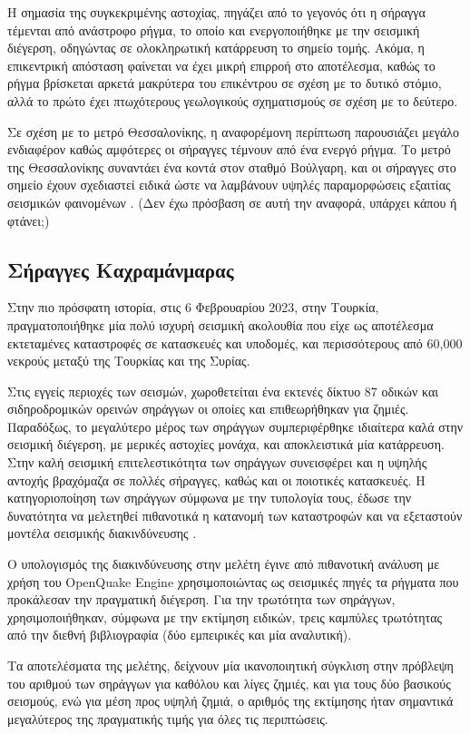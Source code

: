 Η σημασία της συγκεκριμένης αστοχίας, πηγάζει από το γεγονός ότι η σήραγγα τέμενται από ανάστροφο ρήγμα, το οποίο και ενεργοποιήθηκε με την σεισμική διέγερση, οδηγώντας σε ολοκληρωτική κατάρρευση το σημείο τομής. Ακόμα, η επικεντρική απόσταση φαίνεται να έχει μικρή επιρροή στο αποτέλεσμα, καθώς το ρήγμα βρίσκεται αρκετά μακρύτερα του επικέντρου σε σχέση με το δυτικό στόμιο, αλλά το πρώτο έχει πτωχότερους γεωλογικούς σχηματισμούς σε σχέση με το δεύτερο.

Σε σχέση με το μετρό Θεσσαλονίκης, η αναφορέμονη περίπτωση παρουσιάζει μεγάλο ενδιαφέρον καθώς αμφότερες οι σήραγγες τέμνουν από ένα ενεργό ρήγμα. Το μετρό της Θεσσαλονίκης συναντάει ένα κοντά στον σταθμό Βούλγαρη, και οι σήραγγες στο σημείο έχουν σχεδιαστεί ειδικά ώστε να λαμβάνουν υψηλές παραμορφώσεις εξαιτίας σεισμικών φαινομένων \parencite{Gavrielatou}. (Δεν έχω πρόσβαση σε αυτή την αναφορά, υπάρχει κάπου ή φτάνει;)

\subsection{Σήραγγες Καχραμάνμαρας}
Στην πιο πρόσφατη ιστορία, στις 6 Φεβρουαρίου 2023, στην Τουρκία, πραγματοποιήθηκε μία πολύ ισχυρή σεισμική ακολουθία που είχε ως αποτέλεσμα εκτεταμένες καταστροφές σε κατασκευές και υποδομές, και περισσότερους από 60,000 νεκρούς μεταξύ της Τουρκίας και της Συρίας.

Στις εγγείς περιοχές των σεισμών, χωροθετείται ένα εκτενές δίκτυο 87 οδικών και σιδηροδρομικών ορεινών σηράγγων οι οποίες και επιθεωρήθηκαν για ζημιές. Παραδόξως, το μεγαλύτερο μέρος των σηράγγων συμπεριφέρθηκε ιδιαίτερα καλά στην σεισμική διέγερση, με μερικές αστοχίες μονάχα, και αποκλειστικά μία κατάρρευση. Στην καλή σεισμική επιτελεστικότητα των σηράγγων συνεισφέρει και η υψηλής αντοχής βραχόμαζα σε πολλές σήραγγες, καθώς και οι ποιοτικές κατασκευές. Η κατηγοριοποίηση των σηράγγων σύμφωνα με την τυπολογία τους, έδωσε την δυνατότητα να μελετηθεί πιθανοτικά η κατανομή των καταστροφών και να εξεταστούν μοντέλα σεισμικής διακινδύνευσης  \parencite{Apostolaki}.

Ο υπολογισμός της διακινδύνευσης στην μελέτη έγινε από πιθανοτική ανάλυση με χρήση του OpenQuake Engine χρησιμοποιώντας ως σεισμικές πηγές τα ρήγματα που προκάλεσαν την πραγματική διέγερση. Για την τρωτότητα των σηράγγων, χρησιμοποιήθηκαν, σύμφωνα με την εκτίμηση ειδικών, τρεις καμπύλες τρωτότητας από την διεθνή βιβλιογραφία (δύο εμπειρικές και μία αναλυτική).

Τα αποτελέσματα της μελέτης, δείχνουν μία ικανοποιητική σύγκλιση στην πρόβλεψη του αριθμού των σηράγγων για καθόλου και λίγες ζημιές, και για τους δύο βασικούς σεισμούς, ενώ για μέση προς υψηλή ζημιά, ο αριθμός της εκτίμησης ήταν σημαντικά μεγαλύτερος της πραγματικής τιμής για όλες τις περιπτώσεις.

